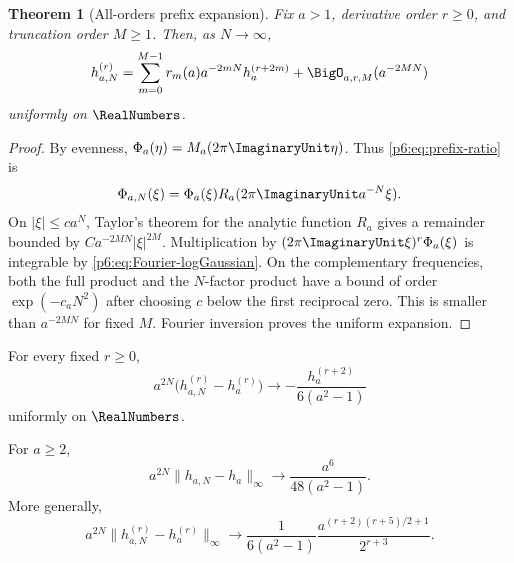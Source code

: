 \documentclass[11pt,oneside]{article}
\numberwithin{equation}{section}
\newtheorem{theorem}{Theorem}[section]
\theoremstyle{definition}
\theoremstyle{remark}
\begin{document}
\begin{theorem}[All-orders prefix expansion]\label{p6:thm:prefix-expansion}
Fix $a>1$, derivative order $r\ge0$, and truncation order $M\ge1$.  Then, as
$N\to\infty$,
\begin{equation}\label{p6:eq:prefix-expansion}
 h_{a,N}^{(r)}
 =\sum_{m=0}^{M-1}
 r_m(a)a^{-2mN}h_a^{(r+2m)}
 +\BigO_{a,r,M}(a^{-2MN})
\end{equation}
uniformly on $\RealNumbers$.
\end{theorem}

\begin{proof}
By evenness,
$\Phi_a(\eta)=M_a(2\pi\ImaginaryUnit\eta)$.  Thus
\eqref{p6:eq:prefix-ratio} is
\[
 \Phi_{a,N}(\xi)=
 \Phi_a(\xi)R_a(2\pi\ImaginaryUnit a^{-N}\xi).
\]
On $|\xi|\le c a^N$, Taylor's theorem for the analytic function $R_a$ gives a
remainder bounded by
$C a^{-2MN}|\xi|^{2M}$.  Multiplication by
$(2\pi\ImaginaryUnit\xi)^r\Phi_a(\xi)$ is integrable by
\eqref{p6:eq:Fourier-logGaussian}.  On the complementary frequencies, both the
full product and the $N$-factor product have a bound of order
$\exp(-c_aN^2)$ after choosing $c$ below the first reciprocal zero.  This is
smaller than $a^{-2MN}$ for fixed $M$.  Fourier inversion proves the uniform
expansion.
\end{proof}

\begin{corollary}\label{p6:cor:first-prefix-correction}
For every fixed $r\ge0$,
\begin{equation}\label{p6:eq:first-prefix-correction}
 a^{2N}\bigl(h_{a,N}^{(r)}-h_a^{(r)}\bigr)
 \longrightarrow
 -\frac{h_a^{(r+2)}}{6(a^2-1)}
\end{equation}
uniformly on $\RealNumbers$.
\end{corollary}

\begin{corollary}\label{p6:cor:prefix-norm}
For $a\ge2$,
\begin{equation}\label{p6:eq:prefix-norm-leading}
 a^{2N}\|h_{a,N}-h_a\|_\infty
 \longrightarrow
 \frac{a^6}{48(a^2-1)}.
\end{equation}
More generally,
\begin{equation}\label{p6:eq:prefix-derivative-norm-leading}
 a^{2N}\|h_{a,N}^{(r)}-h_a^{(r)}\|_\infty
 \longrightarrow
 \frac{1}{6(a^2-1)}
 \frac{a^{(r+2)(r+5)/2+1}}{2^{r+3}}.
\end{equation}
\end{corollary}
\end{document}
